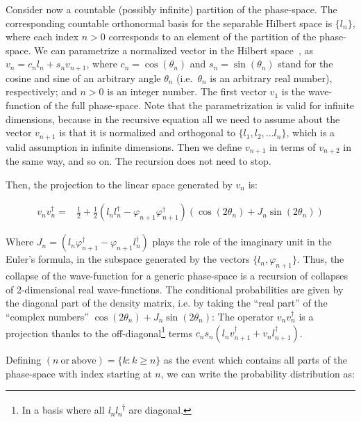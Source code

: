 \documentclass[11pt]{book}
\begin{document}
Consider now a countable (possibly infinite) partition of the
phase-space. The corresponding countable orthonormal basis for the
separable Hilbert space is \(\{l_n\}\), where each index \(n>0\)
corresponds to an element of the partition of the phase-space. We can
parametrize a normalized vector in the Hilbert
space~\cite{Hoffman1972Generalization}, as \(v_n=c_n l_n+s_n v_{n+1}\), where \(c_n=\cos(\theta_n)\) and
\(s_n=\sin(\theta_n)\) stand for the cosine and sine of an arbitrary
angle \(\theta_n\) (i.e.~\(\theta_n\) is an arbitrary real number),
respectively; and \(n>0\) is an integer number. The first vector \(v_1\)
is the wave-function of the full phase-space. Note that the
parametrization is valid for infinite dimensions, because in the
recursive equation all we need to assume about the vector \(v_{n+1}\) is
that it is normalized and orthogonal to \(\{l_1, l_2, ... l_n\}\), which
is a valid assumption in infinite dimensions. Then we define \(v_{n+1}\)
in terms of \(v_{n+2}\) in the same way, and so on. The recursion does
not need to stop.

Then, the projection to the linear space generated by \(v_n\) is:

\begin{equation}\begin{aligned}
  v_nv_n^\dagger=&\frac{1}{2}+\frac{1}{2}(l_{n}l_{n}^\dagger-\varphi_{n+1}\varphi_{n+1}^\dagger) (\cos(2\theta_{n})+J_{n}\sin(2\theta_{n}))
 \end{aligned}\end{equation}

Where \(J_n=(l_{n}\varphi_{n+1}^\dagger-\varphi_{n+1}l_{n}^\dagger)\)
plays the role of the imaginary unit in the Euler's formula, in the
subspace generated by the vectors \(\{l_{n}, \varphi_{n+1}\}\). Thus,
the collapse of the wave-function for a generic phase-space is a
recursion of collapses of 2-dimensional real wave-functions. The
conditional probabilities are given by the diagonal part of the density
matrix, i.e. by taking the ``real part'' of the ``complex numbers''
\(\cos(2\theta_n) +J_n\sin(2\theta_n)\): The operator
\(v_n v_n^\dagger\) is a projection thanks to the
off-diagonal\footnote{In a basis where all
  {\emph{l}\textsubscript{\emph{n}}\emph{l}\textsubscript{\emph{n}}\textsuperscript{†}}
  are diagonal.} terms
\(c_ns_n(l_n v_{n+1}^\dagger+v_n l_{n+1}^\dagger)\).

Defining \((n\mathrm{\ or\ above})=\{k : k\geq n\}\) as the event which
contains all parts of the phase-space with index starting at \(n\), we
can write the probability distribution as:
\end{document}
